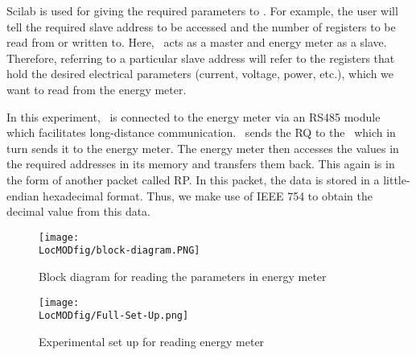 Scilab is used for giving the required parameters to \arduino. For
example, the user will tell the required slave address to be accessed
and the number of registers to be read from or written to. Here,
\arduino\ acts as a master and energy meter as a slave. Therefore,
referring to a particular slave address will refer to the registers
that hold the desired electrical parameters (current, voltage, power, etc.), which we want to read from the energy meter.

In this experiment, \arduino\ is connected to the energy meter via an RS485 module which facilitates long-distance communication. 
\scilab\ sends the RQ to the \arduino\, which in turn sends it to the
energy meter. The energy meter then accesses the values in the
required addresses in its memory and transfers them back. This again
is in the form of another packet called RP. In this packet, the data is stored in a little-endian hexadecimal format. Thus, we make use of IEEE 754 to obtain the decimal value from this data. 


\begin{figure}
  \centering
  \texttt{[image: \\LocMODfig/block-diagram.PNG]}
  \caption{Block diagram for reading the parameters in energy meter}
  \label{fig:block-diagram}
\end{figure}

\begin{figure}
  \centering
  \texttt{[image: \\LocMODfig/Full-Set-Up.png]}
  \caption{Experimental set up for reading energy meter}
  \label{fig:full-set-up}
\end{figure}

